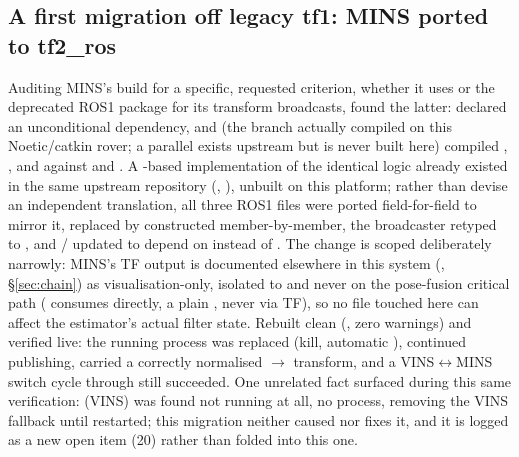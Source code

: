 \subsection{A first migration off legacy tf1: MINS ported to tf2\_ros}
\label{sec:july22tf2}
Auditing MINS's build for a specific, requested criterion, whether it uses
 or the deprecated ROS1  package for its transform
broadcasts, found the latter: 
declared an unconditional  dependency, and
 (the branch actually compiled on this Noetic/catkin
rover; a parallel  exists upstream but is never built
here) compiled , , and
 against  and
. A -based implementation of the
identical logic already existed in the same upstream repository
(, ), unbuilt on this platform;
rather than devise an independent translation, all three ROS1 files were
ported field-for-field to mirror it,  replaced by
 constructed member-by-member, the
broadcaster retyped to , and
/ updated to depend on
 instead of . The change is scoped deliberately
narrowly: MINS's TF output is documented elsewhere in this system
(, \S\ref{sec:chain}) as visualisation-only, isolated to
 and never on the pose-fusion critical path
( consumes  directly, a plain
, never via TF), so no file touched here can affect
the estimator's actual filter state. Rebuilt clean (, zero warnings) and verified live: the running process was replaced
(kill, automatic ),  continued publishing,
 carried a correctly normalised
$\to$ transform, and a VINS$\leftrightarrow$MINS
switch cycle through  still succeeded. One unrelated
fact surfaced during this same verification:  (VINS) was
found not running at all, no process, removing the VINS fallback until
restarted; this migration neither caused nor fixes it, and it is logged
as a new open item (20) rather than folded into this one.

